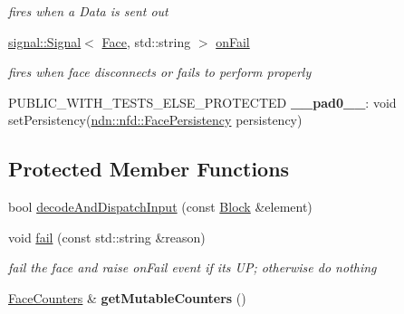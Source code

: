 \begin{DoxyCompactItemize}
\begin{DoxyCompactList}\small\item\em fires when a Data is sent out \end{DoxyCompactList}\item 
\hyperlink{classndn_1_1util_1_1signal_1_1Signal}{signal\+::\+Signal}$<$ \hyperlink{classnfd_1_1Face}{Face}, std\+::string $>$ \hyperlink{classnfd_1_1Face_a0f6ac85e5c965d24290f87562022123f}{on\+Fail}\hypertarget{classnfd_1_1Face_a0f6ac85e5c965d24290f87562022123f}{}\label{classnfd_1_1Face_a0f6ac85e5c965d24290f87562022123f}

\begin{DoxyCompactList}\small\item\em fires when face disconnects or fails to perform properly \end{DoxyCompactList}\item 
P\+U\+B\+L\+I\+C\+\_\+\+W\+I\+T\+H\+\_\+\+T\+E\+S\+T\+S\+\_\+\+E\+L\+S\+E\+\_\+\+P\+R\+O\+T\+E\+C\+T\+ED {\bfseries \+\_\+\+\_\+pad0\+\_\+\+\_\+}\+: void set\+Persistency(\hyperlink{group__management_ga05df4b7c484a0fae25d3e65962511bac}{ndn\+::nfd\+::\+Face\+Persistency} persistency)\hypertarget{classnfd_1_1Face_a7c031b6c8597321196fc8429ea558442}{}\label{classnfd_1_1Face_a7c031b6c8597321196fc8429ea558442}

\end{DoxyCompactItemize}
\subsection*{Protected Member Functions}
\begin{DoxyCompactItemize}
\item 
bool \hyperlink{classnfd_1_1Face_af538b4501eeb74099183bfdc13a10c80}{decode\+And\+Dispatch\+Input} (const \hyperlink{classndn_1_1Block}{Block} \&element)
\item 
void \hyperlink{classnfd_1_1Face_a924bec6d0e2a541bdec020ce048a433d}{fail} (const std\+::string \&reason)\hypertarget{classnfd_1_1Face_a924bec6d0e2a541bdec020ce048a433d}{}\label{classnfd_1_1Face_a924bec6d0e2a541bdec020ce048a433d}

\begin{DoxyCompactList}\small\item\em fail the face and raise on\+Fail event if it\textquotesingle{}s UP; otherwise do nothing \end{DoxyCompactList}\item 
\hyperlink{classnfd_1_1FaceCounters}{Face\+Counters} \& {\bfseries get\+Mutable\+Counters} ()\hypertarget{classnfd_1_1Face_aa0a0f2114d0dddcb8df7d2ef4f33e940}{}\label{classnfd_1_1Face_aa0a0f2114d0dddcb8df7d2ef4f33e940}

\end{DoxyCompactItemize}
